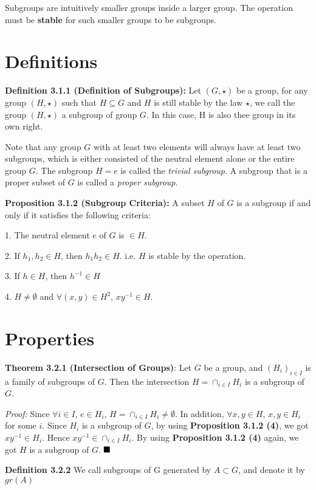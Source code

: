 \documentclass[12pt,openany]{book}
\theoremstyle{definition}
\theoremstyle{definition}
\begin{document}
Subgroups are intuitively smaller groups inside a larger group. The operation must be \textbf{stable} for such smaller groups to be subgroups.

\section{Definitions}

\noindent\textbf{Definition 3.1.1 (Definition of Subgroups):} Let $(G, \star)$ be a group, for any group $(H, \star)$ such that $H \subseteq G$ and $H$ is still stable by the law $\star$, we call the group $(H, \star)$ a subgroup of group $G$. In this case, H is also thee group in its own right.

Note that any group $G$ with at least two elements will always have at least two subgroups, which is either consisted of the neutral element alone or the entire group $G$. The subgroup $H={e}$ is called the \textit{trivial subgroup}. A subgroup that is a proper subset of $G$ is called a \textit{proper subgroup}.

\noindent\textbf{Proposition 3.1.2 (Subgroup Criteria):} A subset $H$ of $G$ is a subgroup if and only if it satisfies the following criteria:

1. The neutral element $e$ of $G$ is $\in H$.

2. If $h_1, h_2 \in H$, then $h_1h_2 \in H$. i.e. $H$ is stable by the operation.

3. If $h \in H$, then $h^{-1} \in H$

4. $H \neq \emptyset$ and $\forall(x,y)\in H^{2}$, $xy^{-1} \in H$.

\section{Properties}

\noindent\textbf{Theorem 3.2.1 (Intersection of Groups)}: Let $G$ be a group, and $(H_{i})_{i \in I}$ is a family of subgroups of $G$. Then the intersection $H = \cap_{i \in I}H_{i}$ is a subgroup of $G$.

\textit{Proof:} Since $\forall i \in I$, $e \in H_{i}$, $H=\cap_{i \in I}H_{i} \neq \emptyset$. In addition, $\forall x,y \in H$, $x,y \in H_{i}$ for some $i$. Since $H_{i}$ is a subgroup of $G$, by using \textbf{Proposition 3.1.2 (4)}, we got $xy^{-1} \in H_{i}$. Hence $xy^{-1} \in \cap_{i \in I}H_{i}$. By using \textbf{Proposition 3.1.2 (4)} again, we got $H$ is a subgroup of $G$. $\hfill\blacksquare$

\noindent\textbf{Definition 3.2.2} We call subgroups of G generated by $A \subset G$, and denote it by $gr(A)$
\end{document}
